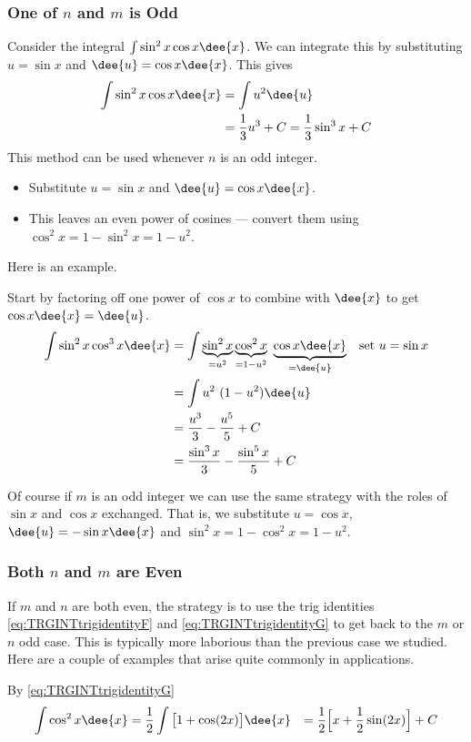 \subsubsection*{One of $n$ and $m$ is Odd}
Consider the integral $\int \sin^2x \cos x\dee{x}$. We can integrate this by substituting
$u=\sin x$ and $\dee{u}=\cos x \dee{x}$. This gives
\begin{align*}
  \int \sin^2x \cos x\dee{x} &= \int u^2 \dee{u} \\
  &= \frac{1}{3}u^3+C = \frac{1}{3}\sin^3x +C
\end{align*}
This method can be used whenever $n$ is an odd integer.
\begin{itemize}
 \item Substitute $u=\sin x$ and $\dee{u}=\cos x\dee{x}$.
 \item This leaves an even power of cosines --- convert them using $\cos^2x = 1-\sin^2x
= 1-u^2$.
\end{itemize}
Here is an example.
\begin{eg}\label{eg:TRGINTa}
Start by factoring off one power of $\cos x$ to combine with $\dee{x}$
to get $\cos x\dee{x}=\dee{u}$.
\begin{align*}
\int \sin^2 x\cos^3 x\dee{x}
&= \int \underbrace{\sin^2 x}_{=u^2}\underbrace{\cos^2 x}_{=1-u^2}\ \underbrace{\cos
x\dee{x}}_{=\dee{u}} & \text{set $u=\sin x$}\\
&= \int u^2\ (1-u^2)\dee{u}\\
&=\frac{u^3}{3}-\frac{u^5}{5}+C \\
&=\frac{\sin^3x}{3}-\frac{\sin^5x}{5}+C
\end{align*}
\end{eg}
Of course if $m$ is an odd integer we can use the same strategy with the
roles of $\sin x$ and $\cos x$ exchanged. That is, we substitute
$u=\cos x$, $\dee{u}=-\sin x\dee{x}$ and $\sin^2 x=1-\cos^2x=1-u^2$.

\subsubsection*{Both $n$ and $m$ are Even}
If $m$ and $n$ are both even, the strategy is to use the trig identities
\eqref{eq:TRGINTtrigidentityF} and \eqref{eq:TRGINTtrigidentityG}
to get back to the $m$ or $n$ odd case. This is typically more laborious than the
previous case we studied. Here are a couple of examples that arise quite commonly in
applications.
\begin{eg}\label{eg:TRGINTb}
By \eqref{eq:TRGINTtrigidentityG}
\begin{alignat*}{3}
\int \cos^2 x\dee{x}
&= \frac{1}{2}\int \big[1+\cos(2x)\big]\dee{x}  %
&= \frac{1}{2} \Big[x+\frac{1}{2}\sin(2x)\Big] + C
\end{alignat*}
\end{eg}

